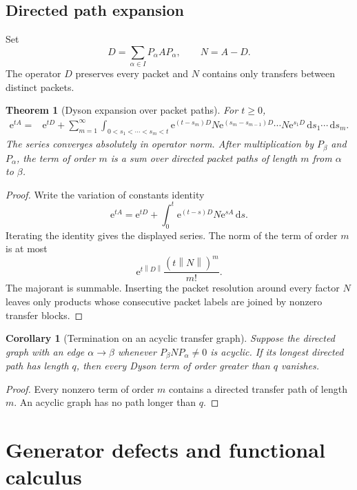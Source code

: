 \documentclass{aomart}
\newtheorem{theorem}{Theorem}[section]
\newtheorem{corollary}[corollary]{Corollary}
\theoremstyle{definition}
\theoremstyle{remark}
\newcommand{\e}{\mathrm e}
\newcommand{\dd}{\,\mathrm d}
\newcommand{\norm}[1]{\left\lVert#1\right\rVert}
\begin{document}
\subsection{Directed path expansion}

Set
\[
D=\sum_{\alpha\in I}P_\alpha AP_\alpha,
\qquad
N=A-D.
\]
The operator \(D\) preserves every packet and \(N\) contains only transfers between distinct packets.

\begin{theorem}[Dyson expansion over packet paths]\label{thm:dyson_paths}
For \(t\geq0\),
\[
\begin{aligned}
\e^{tA}
={}&\e^{tD}
+
\sum_{m=1}^{\infty}
\int_{0<s_1<\cdots<s_m<t}
\e^{(t-s_m)D}N\e^{(s_m-s_{m-1})D}
\cdots
N\e^{s_1D}
\dd s_1\cdots\dd s_m.
\end{aligned}
\]
The series converges absolutely in operator norm. After multiplication by \(P_\beta\) and \(P_\alpha\), the term of order \(m\) is a sum over directed packet paths of length \(m\) from \(\alpha\) to \(\beta\).
\end{theorem}

\begin{proof}
Write the variation of constants identity
\[
\e^{tA}
=
\e^{tD}
+
\int_0^t\e^{(t-s)D}N\e^{sA}\dd s.
\]
Iterating the identity gives the displayed series. The norm of the term of order \(m\) is at most
\[
\e^{t\norm D}\frac{(t\norm N)^m}{m!}.
\]
The majorant is summable. Inserting the packet resolution around every factor \(N\) leaves only products whose consecutive packet labels are joined by nonzero transfer blocks.
\end{proof}

\begin{corollary}[Termination on an acyclic transfer graph]\label{cor:acyclic_termination}
Suppose the directed graph with an edge \(\alpha\to\beta\) whenever \(P_\beta NP_\alpha\neq0\) is acyclic. If its longest directed path has length \(q\), then every Dyson term of order greater than \(q\) vanishes.
\end{corollary}

\begin{proof}
Every nonzero term of order \(m\) contains a directed transfer path of length \(m\). An acyclic graph has no path longer than \(q\).
\end{proof}

\section{Generator defects and functional calculus}\label{sec:defects}
\end{document}
